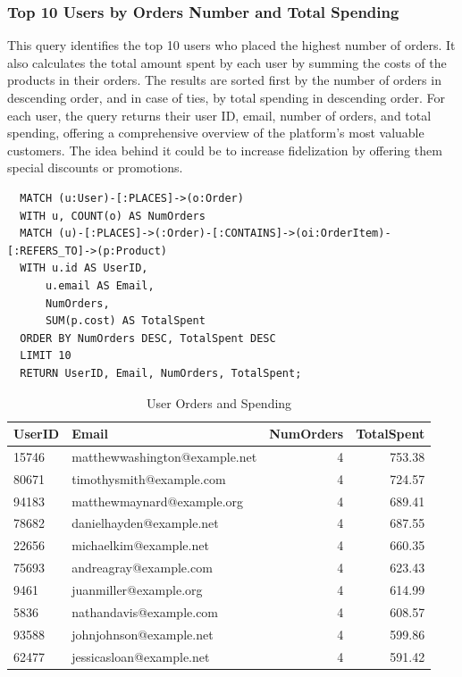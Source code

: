 \documentclass[a4paper,12pt]{article}
\begin{document}
\subsubsection{Top 10 Users by Orders Number and Total Spending}
This query identifies the top 10 users who placed the highest number of orders. It also calculates the total amount spent by each user by summing the costs of the products in their orders. The results are sorted first by the number of orders in descending order, and in case of ties, by total spending in descending order. For each user, the query returns their user ID, email, number of orders, and total spending, offering a comprehensive overview of the platform's most valuable customers.
The idea behind it could be to increase fidelization by offering them special discounts or promotions.
\begin{verbatim}
  MATCH (u:User)-[:PLACES]->(o:Order)
  WITH u, COUNT(o) AS NumOrders
  MATCH (u)-[:PLACES]->(:Order)-[:CONTAINS]->(oi:OrderItem)-[:REFERS_TO]->(p:Product)
  WITH u.id AS UserID, 
      u.email AS Email, 
      NumOrders, 
      SUM(p.cost) AS TotalSpent
  ORDER BY NumOrders DESC, TotalSpent DESC
  LIMIT 10
  RETURN UserID, Email, NumOrders, TotalSpent;
\end{verbatim}
\begin{table}[h!]
  \centering
  \caption{User Orders and Spending}
  \label{tab:user_orders_spending}
  \begin{tabular}{l l r r}
      \toprule
      \textbf{UserID} & \textbf{Email} & \textbf{NumOrders} & \textbf{TotalSpent} \\
      \midrule
      15746 & matthewwashington@example.net & 4 & 753.38 \\
      80671 & timothysmith@example.com       & 4 & 724.57 \\
      94183 & matthewmaynard@example.org     & 4 & 689.41 \\
      78682 & danielhayden@example.net       & 4 & 687.55 \\
      22656 & michaelkim@example.net         & 4 & 660.35 \\
      75693 & andreagray@example.com         & 4 & 623.43 \\
      9461  & juanmiller@example.org         & 4 & 614.99 \\
      5836  & nathandavis@example.com        & 4 & 608.57 \\
      93588 & johnjohnson@example.net        & 4 & 599.86 \\
      62477 & jessicasloan@example.net       & 4 & 591.42 \\
      \bottomrule
  \end{tabular}
\end{table}
\end{document}
